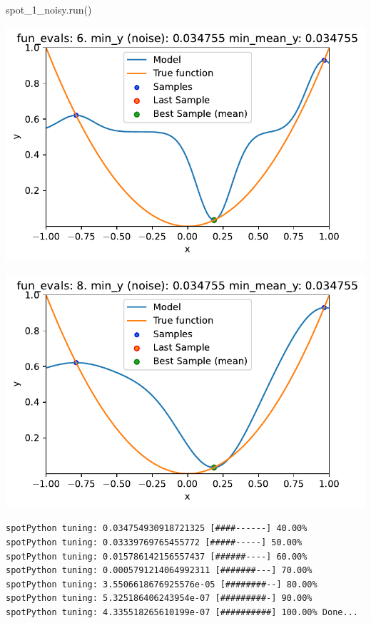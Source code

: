 \documentclass[
  letterpaper,
  DIV=11,
  numbers=noendperiod]{scrreprt}
\newenvironment{Shaded}{\begin{snugshade}}{\end{snugshade}}
\newcommand{\NormalTok}[1]{\textcolor[rgb]{0.00,0.23,0.31}{#1}}
\begin{document}
\begin{Shaded}
\begin{Highlighting}[]
\NormalTok{spot\_1\_noisy.run()}
\end{Highlighting}
\end{Shaded}

\includegraphics{013_num_spot_noisy_files/figure-pdf/cell-10-output-1.pdf}

\includegraphics{013_num_spot_noisy_files/figure-pdf/cell-10-output-2.pdf}

\begin{verbatim}
spotPython tuning: 0.034754930918721325 [####------] 40.00% 
spotPython tuning: 0.03339769765455772 [#####-----] 50.00% 
spotPython tuning: 0.015786142156557437 [######----] 60.00% 
spotPython tuning: 0.0005791214064992311 [#######---] 70.00% 
spotPython tuning: 3.5506618676925576e-05 [########--] 80.00% 
spotPython tuning: 5.325186406243954e-07 [#########-] 90.00% 
spotPython tuning: 4.335518265610199e-07 [##########] 100.00% Done...
\end{verbatim}
\end{document}
